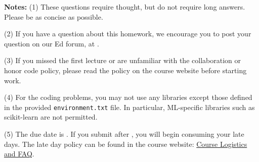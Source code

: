 {\bf Notes:} 
(1) These questions require thought, but do not require long
answers. Please be as concise as possible.  

(2) If you have a question
about this homework, we encourage you to post your question on our
Ed forum, at \edstem. 

(3) If you
missed the first lecture or are unfamiliar with the collaboration or honor
code policy, please read the policy on the course website before starting work.

(4) For the coding problems, you may not
use any libraries except those defined in the provided \texttt{environment.txt}
file. In particular, ML-specific libraries such as scikit-learn are not
permitted. 

(5) The due date is \due. If you submit after
\due, you will begin consuming your
late days. The late day policy can be found in the course website:  \href{https://docs.google.com/document/d/1OCFrAj-Zniw5gzjeAKxVRFCvi-u0qnTv/edit#heading=h.gjdgxs}{Course Logistics and FAQ}.

